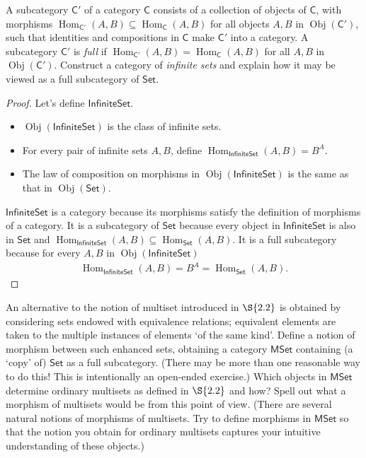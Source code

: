 \begin{exercise}{3.8}
	A subcategory $\mathsf{C}'$ of a category $\mathsf{C}$ consists of a collection of objects of $\mathsf{C}$, with morphisms $\operatorname{Hom}_{\mathsf{C}'}(A, B) \subseteq \operatorname{Hom}_{\mathsf{C}}(A, B)$ for all objects $A, B$ in $\operatorname{Obj}(\mathsf{C}')$, such that identities and compositions in $\mathsf{C}$ make $\mathsf{C}'$ into a category. A subcategory $\mathsf{C}'$ is \textit{full} if $\operatorname{Hom}_{\mathsf{C}'}(A, B) = \operatorname{Hom}_{\mathsf{C}}(A, B)$ for all $A, B$ in $\operatorname{Obj}(\mathsf{C}')$. Construct a category of \textit{infinite sets} and explain how it may be viewed as a full subcategory of $\mathsf{Set}$.
\end{exercise}

\begin{proof}
	Let's define $\mathsf{InfiniteSet}$.
	\begin{itemize}
		\item $\operatorname{Obj}(\mathsf{InfiniteSet})$ is the class of infinite sets.
		\item For every pair of infinite sets $A, B$, define $\operatorname{Hom}_{\mathsf{InfiniteSet}}(A, B) = B^{A}$.
		\item The law of composition on morphisms in $\operatorname{Obj}(\mathsf{InfiniteSet})$ is the same as that in $\operatorname{Obj}(\mathsf{Set})$.
	\end{itemize}

	$\mathsf{InfiniteSet}$ is a category because its morphisms satisfy the definition of morphisms of a category. It is a subcategory of $\mathsf{Set}$ because every object in $\mathsf{InfiniteSet}$ is also in $\mathsf{Set}$ and $\operatorname{Hom}_{\mathsf{InfiniteSet}}(A, B)\subseteq \operatorname{Hom}_{\mathsf{Set}}(A, B)$. It is a full subcategory because for every $A, B$ in $\operatorname{Obj}(\mathsf{InfiniteSet})$
	\begin{align*}
		\operatorname{Hom}_{\mathsf{InfiniteSet}}(A, B) = B^{A} = \operatorname{Hom}_{\mathsf{Set}}(A, B).
	\end{align*}
\end{proof}

\begin{exercise}{3.9}\label{exercise:1-3.9}
	An alternative to the notion of multiset introduced in $\S{2.2}$ is obtained by considering sets endowed with equivalence relations; equivalent elements are taken to the multiple instances of elements `of the same kind'. Define a notion of morphism between such enhanced sets, obtaining a category $\mathsf{MSet}$ containing (a `copy' of) $\mathsf{Set}$ as a full subcategory. (There may be more than one reasonable way to do this! This is intentionally an open-ended exercise.) Which objects in $\mathsf{MSet}$ determine ordinary multisets as defined in $\S{2.2}$ and how? Spell out what a morphism of multisets would be from this point of view. (There are several natural notions of morphisms of multisets. Try to define morphisms in $\mathsf{MSet}$ so that the notion you obtain for ordinary multisets captures your intuitive understanding of these objects.)
\end{exercise}

